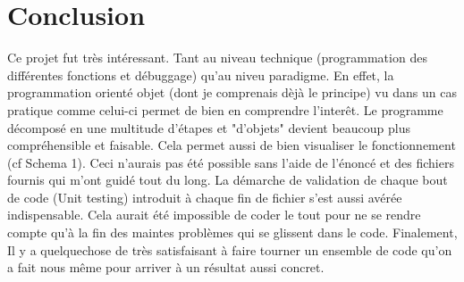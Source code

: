 \documentclass[french]{article}
\begin{document}
\section{Conclusion}
	Ce projet fut très intéressant. Tant au niveau technique (programmation des différentes fonctions et débuggage)
	qu'au niveu paradigme. En effet, la programmation orienté objet (dont je comprenais dèjà le principe) vu dans un cas
	pratique comme celui-ci permet de bien en comprendre l'interêt. Le programme décomposé en une multitude d'étapes et
	"d'objets" devient beaucoup plus compréhensible et faisable. Cela permet aussi de bien visualiser le fonctionnement (cf Schema 1).
	Ceci n'aurais pas été possible sans l'aide de l'énoncé et des fichiers fournis qui m'ont guidé tout du long. La démarche
	de validation de chaque bout de code (Unit testing) introduit à chaque fin de fichier s'est aussi avérée indispensable.
	Cela aurait été impossible de coder le tout pour ne se rendre compte qu'à la fin des maintes problèmes qui se glissent dans le code.
	Finalement, Il y a quelquechose de très satisfaisant à faire tourner un ensemble de code qu'on a fait nous même pour arriver à un
	résultat aussi concret.
\end{document}
